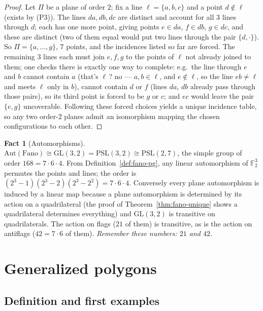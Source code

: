 \documentclass[11pt]{article}
\theoremstyle{definition}
\newtheorem{fact}[theorem]{Fact}
\newcommand{\F}{\mathbb{F}}
\newcommand{\PSL}{\mathrm{PSL}}
\newcommand{\GL}{\mathrm{GL}}
\newcommand{\Aut}{\mathrm{Aut}}
\begin{document}
\begin{proof}
Let $\Pi$ be a plane of order $2$; fix a line $\ell = \{a,b,c\}$ and a point
$d \notin \ell$ (exists by (P3)). The lines $da, db, dc$ are distinct and
account for all $3$ lines through $d$; each has one more point, giving points
$e \in da$, $f \in db$, $g \in dc$, and these are distinct (two of them equal
would put two lines through the pair $\{d,\cdot\}$). So
$\Pi = \{a,\dots,g\}$, $7$ points, and the incidences listed so far are
forced. The remaining $3$ lines each must join $e,f,g$ to the points of
$\ell$ not already joined to them; one checks there is exactly one way to
complete: e.g.\ the line through $e$ and $b$ cannot contain $a$ (that's
$\ell\,$? no --- $a,b \in \ell$, and $e\notin\ell$, so the line $eb \ne \ell$
and meets $\ell$ only in $b$), cannot contain $d$ or $f$ (lines $da$, $db$
already pass through those pairs), so its third point is forced to be $g$ or
$c$; and $ec$ would leave the pair $\{e,g\}$ uncoverable. Following these
forced choices yields a unique incidence table, so any two order-$2$ planes
admit an isomorphism mapping the chosen configurations to each other.
\end{proof}

\begin{fact}[Automorphisms]\label{fact:fano-aut}
$\Aut(\text{Fano}) \cong \GL(3,2) = \PSL(3,2) \cong \PSL(2,7)$, the simple
group of order $168 = 7\cdot 6\cdot 4$. From Definition~\ref{def:fano-pg},
any linear automorphism of $\F_2^3$ permutes the points and lines; the order
is $(2^3-1)(2^3-2)(2^3-2^2) = 7\cdot6\cdot4$. Conversely every plane
automorphism is induced by a linear map because a plane automorphism is
determined by its action on a quadrilateral (the proof of
Theorem~\ref{thm:fano-unique} shows a quadrilateral determines everything)
and $\GL(3,2)$ is transitive on quadrilaterals. The action on flags
($21$ of them) is transitive, as is the action on antiflags ($42 = 7\cdot 6$
of them). \emph{Remember these numbers: $21$ and $42$.}
\end{fact}

\section{Generalized polygons}\label{sec:genpoly}

\subsection{Definition and first examples}
\end{document}
